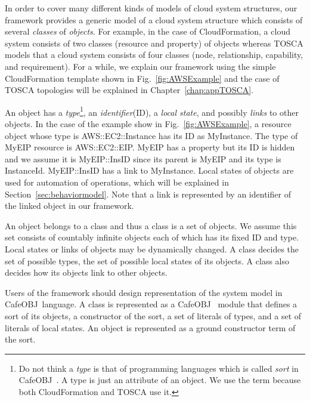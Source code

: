\documentclass[12pt]{report}
\newcommand{\cafeobj}{{\sf CafeOBJ}~}
\begin{document}
In order to cover many different kinds of models of cloud system
structures, our framework provides a generic model of a cloud system
structure which consists of several {\it classes} of {\it
  objects}. For example, in the case of CloudFormation, a cloud system
consists of two classes (resource and property) of objects whereas
TOSCA models that a cloud system consists of four classes (node,
relationship, capability, and requirement). For a while, we explain
our framework using the simple CloudFormation template shown in
Fig.~\ref{fig:AWSExample} and the case of TOSCA topologies will be
explained in Chapter~\ref{chap:appTOSCA}.

An object has a {\it type}\footnote{Do not think a {\it type} is that
  of programming languages which is called {\it sort} in \cafeobj. A
  type is just an attribute of an object. We use the term because both
  CloudFormation and TOSCA use it.}, an {\it identifier}(ID), a {\it
  local state}, and possibly {\it links} to other objects. In the case
of the example show in Fig.~\ref{fig:AWSExample}, a resource object
whose type is AWS::EC2::Instance has its ID as MyInstance. The type of
MyEIP resource is AWS::EC2::EIP. MyEIP has a property but its ID is
hidden and we assume it is MyEIP::InsID since its parent is MyEIP and
its type is InstanceId. MyEIP::InsID has a link to MyInstance. Local
states of objects are used for automation of operations, which will be
explained in Section~\ref{sec:behaviormodel}. Note that a link is
represented by an identifier of the linked object in our framework.

An object belongs to a class and thus a class is a set of objects. We
assume this set consists of countably infinite objects each of which
has its fixed ID and type. Local states or links of objects may be
dynamically changed.  A class decides the set of possible types, the set
of possible local states of its objects. A class also decides how its
objects link to other objects.

Users of the framework should design representation of the system
model in \cafeobj language.  A class is represented as a \cafeobj
module that defines a sort of its objects, a constructor of the sort,
a set of literals of types, and a set of literals of local states.  An
object is represented as a ground constructor term of the sort.
\end{document}
